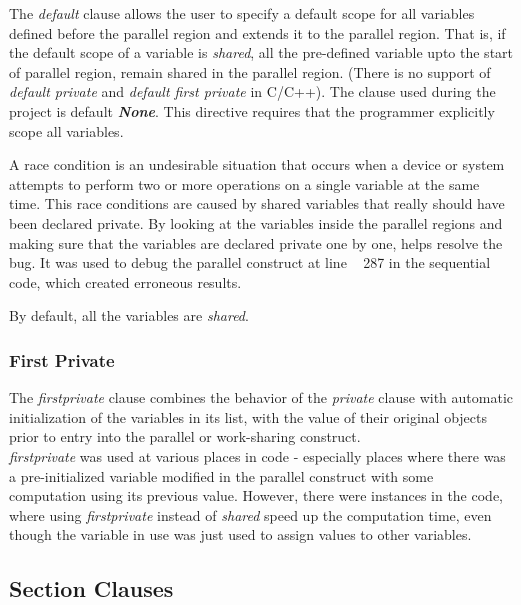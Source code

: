 \documentclass[a4paper, 10pt, conference]{IEEEtran}      %
\begin{document}
	The \textit{default} clause allows the user to specify a default scope for all variables defined before the parallel region and extends it to the parallel region. That is, if the default scope of a variable is \textit{shared}, all the pre-defined variable upto the start of parallel region, remain shared in the parallel region. (There is no support of \textit{default private} and \textit{default first private} in C/C++). The clause used during the project is default \textit{\textbf{None}}. This directive requires that the programmer explicitly scope all variables.
	 
	 A race condition is an undesirable situation that occurs when a device or system attempts to perform two or more operations  on a single variable at the same time. This race conditions are caused by shared variables that really should have been declared private. By looking at the variables inside the parallel regions and making sure that the variables are declared private one by one, helps resolve the bug. It was used to debug the parallel construct at line ~ 287 in the sequential code, which created erroneous results.
	 
	 By default, all the variables are \textit{shared}.\\
	 
	\subsubsection{First Private}
	The \textit{firstprivate} clause combines the behavior of the \textit{private} clause with automatic initialization of the variables in its list, with the value of their original objects prior to entry into the parallel or work-sharing construct.\\
	
	\textit{firstprivate} was used at various places in code - especially places where there was a pre-initialized variable modified in the parallel construct with some computation using its previous value. However, there were instances in the code, where using \textit{firstprivate} instead of \textit{shared} speed up the computation time, even though the variable in use was just used to assign values to other variables. \\
	
	\subsection{Section Clauses}
\end{document}
